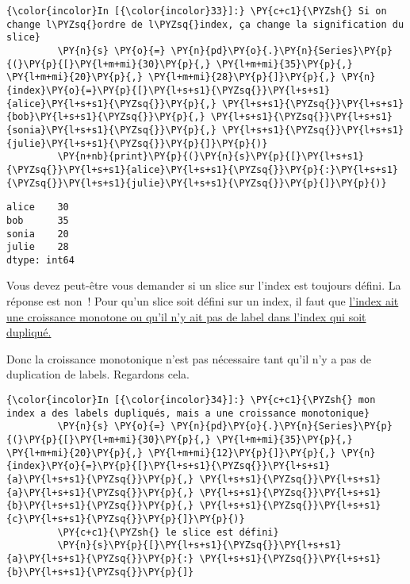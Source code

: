     \begin{Verbatim}[commandchars=\\\{\},frame=single,framerule=0.3mm,rulecolor=\color{cellframecolor}]
{\color{incolor}In [{\color{incolor}33}]:} \PY{c+c1}{\PYZsh{} Si on change l\PYZsq{}ordre de l\PYZsq{}index, ça change la signification du slice}
         \PY{n}{s} \PY{o}{=} \PY{n}{pd}\PY{o}{.}\PY{n}{Series}\PY{p}{(}\PY{p}{[}\PY{l+m+mi}{30}\PY{p}{,} \PY{l+m+mi}{35}\PY{p}{,} \PY{l+m+mi}{20}\PY{p}{,} \PY{l+m+mi}{28}\PY{p}{]}\PY{p}{,} \PY{n}{index}\PY{o}{=}\PY{p}{[}\PY{l+s+s1}{\PYZsq{}}\PY{l+s+s1}{alice}\PY{l+s+s1}{\PYZsq{}}\PY{p}{,} \PY{l+s+s1}{\PYZsq{}}\PY{l+s+s1}{bob}\PY{l+s+s1}{\PYZsq{}}\PY{p}{,} \PY{l+s+s1}{\PYZsq{}}\PY{l+s+s1}{sonia}\PY{l+s+s1}{\PYZsq{}}\PY{p}{,} \PY{l+s+s1}{\PYZsq{}}\PY{l+s+s1}{julie}\PY{l+s+s1}{\PYZsq{}}\PY{p}{]}\PY{p}{)}
         \PY{n+nb}{print}\PY{p}{(}\PY{n}{s}\PY{p}{[}\PY{l+s+s1}{\PYZsq{}}\PY{l+s+s1}{alice}\PY{l+s+s1}{\PYZsq{}}\PY{p}{:}\PY{l+s+s1}{\PYZsq{}}\PY{l+s+s1}{julie}\PY{l+s+s1}{\PYZsq{}}\PY{p}{]}\PY{p}{)}
\end{Verbatim}


    \begin{Verbatim}[commandchars=\\\{\},frame=single,framerule=0.3mm,rulecolor=\color{cellframecolor}]
alice    30
bob      35
sonia    20
julie    28
dtype: int64
\end{Verbatim}

    Vous devez peut-être vous demander si un slice sur l'index est toujours
défini. La réponse est non~! Pour qu'un slice soit défini sur un index,
il faut que
\href{https://pandas.pydata.org/pandas-docs/stable/advanced.html\#non-monotonic-indexes-require-exact-matches}{l'index
ait une croissance monotone ou qu'il n'y ait pas de label dans l'index
qui soit dupliqué.}

Donc la croissance monotonique n'est pas nécessaire tant qu'il n'y a pas
de duplication de labels. Regardons cela.

    \begin{Verbatim}[commandchars=\\\{\},frame=single,framerule=0.3mm,rulecolor=\color{cellframecolor}]
{\color{incolor}In [{\color{incolor}34}]:} \PY{c+c1}{\PYZsh{} mon index a des labels dupliqués, mais a une croissance monotonique}
         \PY{n}{s} \PY{o}{=} \PY{n}{pd}\PY{o}{.}\PY{n}{Series}\PY{p}{(}\PY{p}{[}\PY{l+m+mi}{30}\PY{p}{,} \PY{l+m+mi}{35}\PY{p}{,} \PY{l+m+mi}{20}\PY{p}{,} \PY{l+m+mi}{12}\PY{p}{]}\PY{p}{,} \PY{n}{index}\PY{o}{=}\PY{p}{[}\PY{l+s+s1}{\PYZsq{}}\PY{l+s+s1}{a}\PY{l+s+s1}{\PYZsq{}}\PY{p}{,} \PY{l+s+s1}{\PYZsq{}}\PY{l+s+s1}{a}\PY{l+s+s1}{\PYZsq{}}\PY{p}{,} \PY{l+s+s1}{\PYZsq{}}\PY{l+s+s1}{b}\PY{l+s+s1}{\PYZsq{}}\PY{p}{,} \PY{l+s+s1}{\PYZsq{}}\PY{l+s+s1}{c}\PY{l+s+s1}{\PYZsq{}}\PY{p}{]}\PY{p}{)}
         \PY{c+c1}{\PYZsh{} le slice est défini}
         \PY{n}{s}\PY{p}{[}\PY{l+s+s1}{\PYZsq{}}\PY{l+s+s1}{a}\PY{l+s+s1}{\PYZsq{}}\PY{p}{:} \PY{l+s+s1}{\PYZsq{}}\PY{l+s+s1}{b}\PY{l+s+s1}{\PYZsq{}}\PY{p}{]}
\end{Verbatim}



